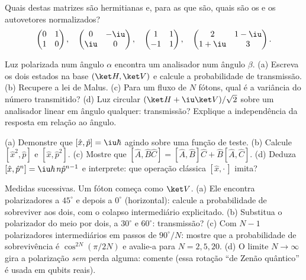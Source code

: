 \begin{exercise}[$\star$]\label{exo:b3:quantum-formalism:2}
Quais destas matrizes são hermitianas e, para as que são, quais são os
 e os autovetores normalizados?
\[
\begin{pmatrix}0 & 1\\ 1 & 0\end{pmatrix} , \quad
\begin{pmatrix}0 & -\iu\\ \iu & 0\end{pmatrix} , \quad
\begin{pmatrix}1 & 1\\ -1 & 1\end{pmatrix} , \quad
\begin{pmatrix}2 & 1-\iu\\ 1+\iu & 3\end{pmatrix} .
\]
\end{exercise}

\begin{exercise}[$\star$]\label{exo:b3:quantum-formalism:3}
Luz polarizada num ângulo $\alpha$ encontra um analisador num ângulo
$\beta$. (a) Escreva os dois estados na base $(\ket H, \ket V)$ e
calcule a probabilidade de transmissão. (b) Recupere a lei de Malus.
(c) Para um fluxo de $N$ fótons, qual é a variância do número
transmitido? (d) Luz circular $(\ket H + \iu\ket V)/\sqrt2$ sobre um
analisador linear em ângulo qualquer: transmissão? Explique a
independência da resposta em relação ao ângulo.
\end{exercise}

\begin{exercise}[$\star$]\label{exo:b3:quantum-formalism:4}
(a) Demonstre que $[\hat x, \hat p] = \iu\hbar$ agindo sobre uma função
de teste. (b) Calcule $[\hat x^2, \hat p]$ e $[\hat x, \hat p^2]$. (c)
Mostre que $[\hat A, \hat B\hat C] = [\hat A, \hat B]\hat C + \hat B[\hat A,
\hat C]$. (d) Deduza $[\hat x, \hat p^n] = \iu\hbar\,n\hat p^{n-1}$ e
interprete: que operação clássica $[\hat x, \cdot\,]$ imita?
\end{exercise}

\begin{exercise}[$\star\star$]\label{exo:b3:quantum-formalism:5}
Medidas sucessivas. Um fóton começa como $\ket V$. (a) Ele encontra
polarizadores a $45^\circ$ e depois a $0^\circ$ (horizontal): calcule a
probabilidade de sobreviver aos dois, com o colapso intermediário
explicitado. (b) Substitua o polarizador do meio por dois, a
$30^\circ$ e $60^\circ$: transmissão? (c) Com $N - 1$ polarizadores
intermediários em passos de $90^\circ/N$: mostre que a probabilidade de
sobrevivência é $\cos^{2N}(\pi/2N)$ e avalie-a para $N = 2, 5, 20$. (d)
O limite $N \to \infty$ gira a polarização \emph{sem} perda alguma:
comente (essa rotação ``de Zenão quântico'' é usada em qubits reais).
\end{exercise}

